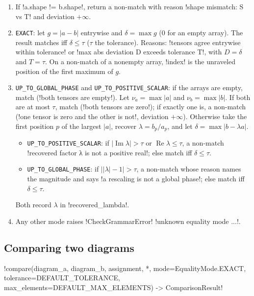 \begin{algorithm}\label{alg:proofs-compare-tensors}
\leavevmode
\begin{enumerate}
\item If \py!a.shape != b.shape!, return a non-match with reason \code!shape mismatch: S vs T! and deviation $+\infty$.
\item \texttt{EXACT}: let $g=|a-b|$ entrywise and $\delta=\max g$ ($0$ for an empty array). The result matches iff $\delta\le\tau$ ($\tau$ the tolerance). Reasons: \code!tensors agree entrywise within tolerance! or \code!max abs deviation D exceeds tolerance T!, with $D=\delta$ and $T=\tau$. On a non-match of a nonempty array, \py!index! is the unraveled position of the first maximum of $g$.
\item \texttt{UP\_TO\_GLOBAL\_PHASE} and \texttt{UP\_TO\_POSITIVE\_SCALAR}: if the arrays are empty, match (\code!both tensors are empty!). Let $\nu_a=\max|a|$ and $\nu_b=\max|b|$. If both are at most $\tau$, match (\code!both tensors are zero!); if exactly one is, a non-match (\code!one tensor is zero and the other is not!, deviation $+\infty$). Otherwise take the first position $p$ of the largest $|a|$, recover $\lambda=b_p/a_p$, and let $\delta=\max|b-\lambda a|$.
  \begin{itemize}
  \item \texttt{UP\_TO\_POSITIVE\_SCALAR}: if $|\operatorname{Im}\lambda|>\tau$ or $\operatorname{Re}\lambda\le\tau$, a non-match \code!recovered factor λ is not a positive real!; else match iff $\delta\le\tau$.
  \item \texttt{UP\_TO\_GLOBAL\_PHASE}: if $\bigl||\lambda|-1\bigr|>\tau$, a non-match whose reason names the magnitude and says \code!a rescaling is not a global phase!; else match iff $\delta\le\tau$.
  \end{itemize}
  Both record $\lambda$ in \py!recovered_lambda!.
\item Any other mode raises \py!CheckGrammarError! \code!unknown equality mode ...!.
\end{enumerate}
\end{algorithm}

\subsection{Comparing two diagrams}

\begin{signature}
\py!compare(diagram_a, diagram_b, assignment, *, mode=EqualityMode.EXACT, tolerance=DEFAULT_TOLERANCE, max_elements=DEFAULT_MAX_ELEMENTS) -> ComparisonResult!
\end{signature}

